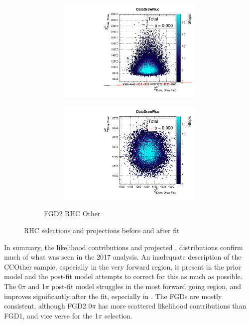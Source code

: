 \begin{figure}[h]
\begin{subfigure}[t]{\textwidth}
\begin{subfigure}[t]{0.24\textwidth}
			\includegraphics[width=\textwidth, trim={0mm 0mm 0mm 8mm}, clip,page=164]{figures/mach3/2018/data/2018a_FixedCov_RedCov_Mpi_Data_merge_PriorPred_procs}
		\end{subfigure}
		\begin{subfigure}[t]{0.24\textwidth}
			\includegraphics[width=\textwidth, trim={0mm 0mm 0mm 8mm}, clip,page=164]{figures/mach3/2018/data/2018a_FixedCov_RedCov_Mpi_Data_merge_PostPredStore_FullLLH_procs}
		\end{subfigure}
		\caption{FGD2 \numu RHC Other}
	\end{subfigure}
	\caption{RHC \numu selections \pmu and \cosmu projections before and after fit}
	\label{fig:fhc_postfit_other_numuRHC_2018}
\end{figure}

In summary, the likelihood contributions and projected \pmu, \cosmu distributions confirm much of what was seen in the 2017 analysis. An inadequate description of the CCOther sample, especially in the very forward region, is present in the prior model and the post-fit model attempts to correct for this as much as possible. The 0$\pi$ and 1$\pi$ post-fit model struggles in the most forward going region, and improves significantly after the fit, especially in \pmu. The FGDs are mostly consistent, although FGD2 0$\pi$ has more scattered likelihood contributions than FGD1, and vice verse for the 1$\pi$ selection.

